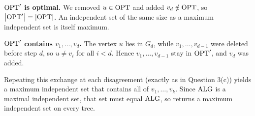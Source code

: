 \documentclass[11pt,addpoints,answers]{exam}
\begin{document}
\begin{questions}
\begin{parts}
\begin{solution}
      \textbf{$\mathrm{OPT}'$ is optimal.}
      We removed $u \in \mathrm{OPT}$ and added $v_d \notin \mathrm{OPT}$, so $\left|\mathrm{OPT}'\right| = \left|\mathrm{OPT}\right|$.
      An independent set of the same size as a maximum independent set is itself maximum.

      \textbf{$\mathrm{OPT}'$ contains $v_1,\dots,v_d$.}
      The vertex $u$ lies in $G_d$, while $v_1,\dots,v_{d-1}$ were deleted before step $d$, so $u \ne v_i$ for all $i<d$.
      Hence $v_1,\dots,v_{d-1}$ stay in $\mathrm{OPT}'$, and $v_d$ was added.

      Repeating this exchange at each disagreement (exactly as in Question 3(c)) yields a maximum independent set that contains all of $v_1,\dots,v_k$.
      Since $\mathrm{ALG}$ is a maximal independent set, that set must equal $\mathrm{ALG}$, so  returns a maximum independent set on every tree.
    \end{solution}

  \end{parts}




\end{questions}
\end{document}
